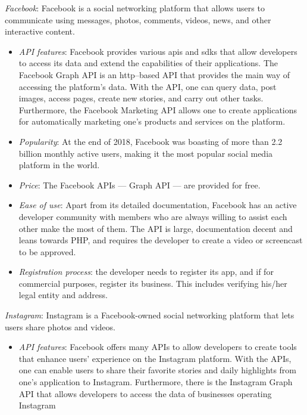 \begin{enum-c}
\item \emph{Facebook}:
  Facebook is a social networking platform that allows users to communicate
  using messages, photos, comments, videos, news, and other interactive content.
  \begin{itemize}
  \item \emph{API features}:
    Facebook provides various \glspl{api} and \glspl{sdk} that allow developers to access its
    data and extend the capabilities of their applications. The Facebook Graph
    API is an \gls{http}--based API that provides the main way of accessing the
    platform's data. With the API, one can query data, post images, access
    pages, create new stories, and carry out other tasks. Furthermore, the
    Facebook Marketing API allows one to create applications for automatically
    marketing one's products and services on the platform.
  \item \emph{Popularity}:
    At the end of 2018, Facebook was boasting of more than 2.2
    billion monthly active users, making it the most popular social media
    platform in the world.
  \item \emph{Price}:
    The Facebook APIs --- Graph API --- are provided for free.
  \item \emph{Ease of use}:
    Apart from its detailed documentation, Facebook has an active
developer community with members who are always willing to assist each other
make the most of them. The API is large, documentation decent and leans towards
PHP, and requires the developer to create a video or screencast to be approved.
\item \emph{Registration process}: the developer needs to register its app, and if for
  commercial purposes, register its business. This includes verifying his/her legal entity and address.
  \end{itemize}
%
\item \emph{Instagram}:
Instagram is a Facebook-owned social networking platform that lets users share
photos and videos.
%
\begin{itemize}
\item \emph{API features}:
  Facebook offers many APIs to allow developers to create tools that enhance
  users' experience on the Instagram platform. With the APIs, one can enable
  users to share their favorite stories and daily highlights from one's
  application to Instagram. Furthermore, there is the Instagram Graph API that
  allows developers to access the data of businesses operating Instagram

\end{itemize}
\end{enum-c}
